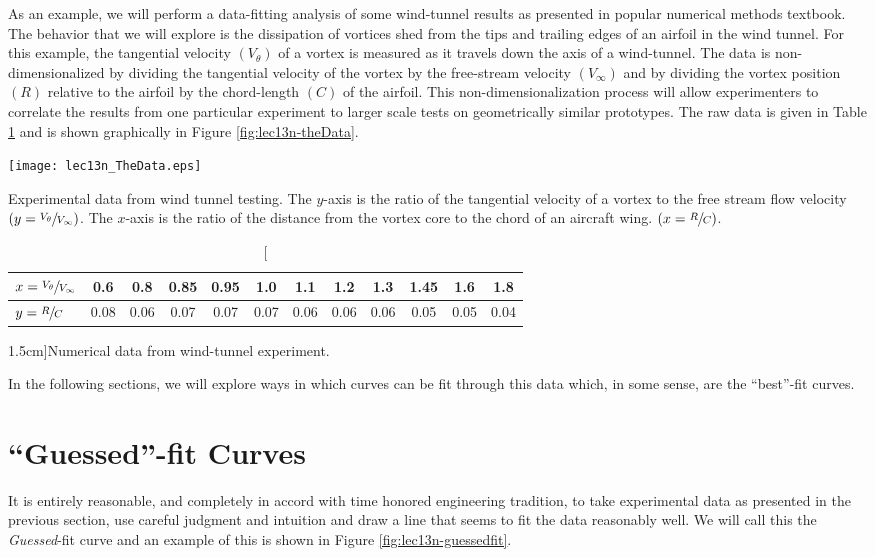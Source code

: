 As an example, we will perform a data-fitting analysis of some wind-tunnel
results as presented in popular numerical methods textbook.\cite[-1.5cm]{gilat} The behavior that we will explore is the dissipation of vortices shed from the tips and trailing
edges of an airfoil in the wind tunnel.  For this example, the tangential
velocity $\left(V_{\theta}\right)$ of a vortex is measured as it travels down the axis of a
wind-tunnel.  The data is non-dimensionalized by dividing the tangential
velocity of the vortex by the free-stream velocity $\left(V_{\infty}\right)$ and by dividing the vortex
position $\left(R\right)$ relative to the airfoil by the chord-length $\left(C\right)$ of the airfoil.  This non-dimensionalization process will allow experimenters to correlate the results from one particular experiment to larger scale tests on geometrically similar prototypes.  The raw data is given in Table \ref{tab:lec13n-numData} and is shown graphically in Figure \ref{fig:lec13n-theData}.
\begin{marginfigure}[-2.5cm]
\texttt{[image: lec13n\_TheData.eps]}
\caption{Experimental data from wind tunnel testing.  The $y$-axis is the
  ratio of the tangential velocity of a vortex to the free stream flow
  velocity $\left( y = \sfrac{V_{\theta}}{V_{\infty}}\right)$.  The $x$-axis is
  the ratio of the distance from the vortex core to the chord of an aircraft
  wing. $\left(x = \sfrac{R}{C}\right)$.}
\label{fig:lec13n-theData}
\end{marginfigure}
\begin{table}[h]
\centering
\begin{tabular}{|l|*{11}{c}|}
\hline
$x = \sfrac{V_{\theta}}{V_{\infty}}$ & 0.6 & 0.8 & 0.85 & 0.95 & 1.0 & 1.1 &
  1.2 & 1.3 & 1.45 & 1.6 & 1.8 \\
\hline
$y = \sfrac{R}{C}$ & 0.08 & 0.06 & 0.07 & 0.07 & 0.07 & 0.06 & 0.06 & 0.06 & 0.05 &
  0.05 & 0.04 \\
\hline
\end{tabular}
\caption[][1.5cm]{Numerical data from wind-tunnel experiment.}
\label{tab:lec13n-numData}
\end{table}
In the following sections, we will explore ways in which curves can be fit through this data which, in some sense, are the ``best''-fit curves.

\section{``Guessed''-fit Curves}
It is entirely reasonable, and completely in accord with time honored engineering tradition, to take experimental data as presented in the previous section, use careful judgment and intuition and draw a line that seems to fit the data reasonably well. We will call this the \emph{Guessed}-fit curve and an example of this is shown in Figure \ref{fig:lec13n-guessedfit}.

